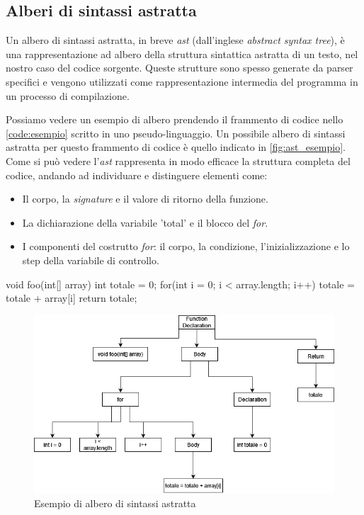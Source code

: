 \subsection{Alberi di sintassi astratta}
Un albero di sintassi astratta, in breve \textit{ast} (dall'inglese \textit{abstract syntax tree}), è una rappresentazione ad albero della struttura sintattica astratta di un testo, nel nostro caso del codice sorgente.
Queste strutture sono spesso generate da parser specifici e vengono utilizzati come rappresentazione intermedia del programma in un processo di compilazione.

Possiamo vedere un esempio di albero prendendo il frammento di codice nello \autoref{code:esempio} scritto in uno pseudo-linguaggio.
Un possibile albero di sintassi astratta per questo frammento di codice è quello indicato in \autoref{fig:ast_esempio}.
Come si può vedere l'\textit{ast} rappresenta in modo efficace la struttura completa del codice, andando ad individuare e distinguere elementi come:
  \begin{itemize}
    \item Il corpo, la \textit{signature} e il valore di ritorno della funzione. 
    \item La dichiarazione della variabile 'total' e il blocco del \textit{for}.
    \item I componenti del costrutto \textit{for}: il corpo, la condizione, l'inizializzazione e lo step della variabile di controllo.
  \end{itemize}

  \begin{code}[caption={Frammento di codice che calcola la somma dei valori in un vettore}, label={code:esempio}]
    void foo(int[] array){
      int totale = 0;
      for(int i = 0; i < array.length; i++){
        totale = totale + array[i]
      }
      return totale;
    }
  \end{code}

\begin{figure}[h]
  \centering
  \includegraphics[scale=0.5]{images/astEsempio.png}
  \caption{Esempio di albero di sintassi astratta}
  \label{fig:ast_esempio}
\end{figure}

